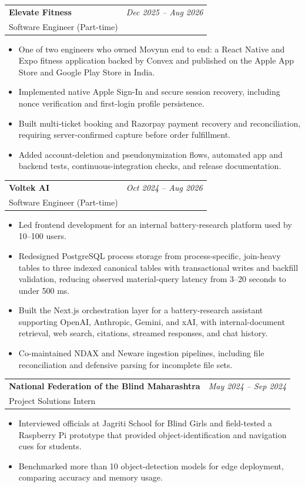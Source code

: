 \documentclass[letterpaper,10pt]{article}
\makeatletter
\newcommand{\artifactwhite}[1]{%
  \special{pdf:code /Artifact BMC}%
  \textcolor{white}{#1}%
  \special{pdf:code EMC}%
}
\newcommand{\linkunderline}[1]{%
  \begingroup
  \setulcolor{linkblue}%
  \setul{0.18ex}{0.45pt}%
  \setuloverlap{0.20pt}%
  \def\SOUL@uleverysyllable{%
    \setbox0=\hbox{\the\SOUL@syllable}%
    \ifdim\dp0>\z@
      \SOUL@ulunderline{\phantom{\the\SOUL@syllable}}%
      \llap{\artifactwhite{\the\SOUL@syllable}}%
      \llap{\artifactwhite{\the\SOUL@syllable}\hspace{0.18pt}}%
      \llap{\artifactwhite{\the\SOUL@syllable}\hspace{-0.18pt}}%
      \llap{%
        \the\SOUL@syllable
        \SOUL@setkern\SOUL@charkern
      }%
    \else
      \SOUL@ulunderline{%
        \the\SOUL@syllable
        \SOUL@setkern\SOUL@charkern
      }%
    \fi
  }%
  \textul{#1}%
  \endgroup
}
\let\originalhref\href
\renewcommand{\href}[2]{\originalhref{#1}{\linkunderline{#2}}}
\newcommand{\experienceentry}[4]{%
  \needspace{5\baselineskip}
  \begin{tabularx}{\linewidth}{@{}X r@{}}
    \textbf{#1} & \textit{\color{muted}#2}\\
    \textcolor{accent}{#3} & \\
  \end{tabularx}
  \vspace{-8pt}
  #4
  \vspace{3pt}
}
\makeatother
\begin{document}
\experienceentry
  {Elevate Fitness}
  {Dec 2025 -- Aug 2026}
  {Software Engineer (Part-time)}
  {
    \begin{itemize}
      \item One of two engineers who owned Movynn end to end: a React Native and Expo fitness application backed by Convex and published on the Apple App Store and Google Play Store in India.
      \item Implemented native Apple Sign-In and secure session recovery, including nonce verification and first-login profile persistence.
      \item Built multi-ticket booking and Razorpay payment recovery and reconciliation, requiring server-confirmed capture before order fulfillment.
      \item Added account-deletion and pseudonymization flows, automated app and backend tests, continuous-integration checks, and release documentation.
    \end{itemize}
  }

\experienceentry
  {Voltek AI}
  {Oct 2024 -- Aug 2026}
  {Software Engineer (Part-time)}
  {
    \begin{itemize}
      \item Led frontend development for an internal battery-research platform used by 10--100 \href{https://www.nanoloy.com}{Nanoloy} users.
      \item Redesigned PostgreSQL process storage from process-specific, join-heavy tables to three indexed canonical tables with transactional writes and backfill validation, reducing observed material-query latency from 3--20 seconds to under 500 ms.
      \item Built the Next.js orchestration layer for a battery-research assistant supporting OpenAI, Anthropic, Gemini, and xAI, with internal-document retrieval, web search, citations, streamed responses, and chat history.
      \item Co-maintained NDAX and Neware ingestion pipelines, including file reconciliation and defensive parsing for incomplete file sets.
    \end{itemize}
  }

\experienceentry
  {National Federation of the Blind Maharashtra}
  {May 2024 -- Sep 2024}
  {Project Solutions Intern}
  {
    \begin{itemize}
      \item Interviewed officials at Jagriti School for Blind Girls and field-tested a Raspberry Pi prototype that provided object-identification and navigation cues for students.
      \item Benchmarked more than 10 object-detection models for edge deployment, comparing accuracy and memory usage.
    \end{itemize}
  }
\end{document}
